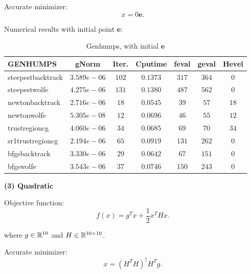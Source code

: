 \documentclass[11pt]{report}
\begin{document}
Accurate minimizer:
\begin{equation}
    x = 0\mathbf{e}  .
\end{equation}

Numerical results with initial point $\mathbf{e}$:
\begin{table}[H]
    \caption{Genhumps, with initial $\mathbf{e}$}
    \label{tab:Genhumps_initial}
    \begin{center}
        \begin{tabular}{l|cccccc}
\textbf{GENHUMPS}&  gNorm       &   Iter.  &   Cputime   &   feval&geval&Hevel\\
\hline
steepestbacktrack   &   $3.589e-06 $&   $102  $&   $0.1373  $&$317  $&$364  $&$0    $       \\
steepestwolfe       &   $4.275e-06 $&   $131  $&   $0.1380  $&$487  $&$562  $&$0    $       \\
newtonbacktrack     &   $2.716e-06 $&   $18   $&   $0.0545  $&$39   $&$57   $&$18   $       \\
newtonwolfe         &   $5.305e-08 $&   $12   $&   $0.0696  $&$46   $&$55   $&$12   $       \\
trustregioncg       &   $4.060e-06 $&   $34   $&   $0.0685  $&$69   $&$70   $&$34   $       \\
sr1trustregioncg    &   $2.194e-06 $&   $65   $&   $0.0919  $&$131  $&$262  $&$0    $       \\
bfgsbacktrack       &   $3.330e-06 $&   $29   $&   $0.0642  $&$67   $&$151  $&$0    $       \\
bfgswolfe           &   $3.543e-06 $&   $37   $&   $0.0746  $&$150  $&$243  $&$0    $       \\
 \end{tabular}
    \end{center}
\end{table}

\textbf{(3) Quadratic }

Objective function: 
\begin{equation}
    f(x) = g^Tx+\frac{1}{2}x^THx.
\end{equation}

where $g\in\mathbb{R}^{10}$ and $H\in \mathbb{R}^{10\times10}$.

Accurate minimizer:
\begin{equation}
    x = (H^TH)^{\dagger}H^Tg.
\end{equation}
\end{document}
